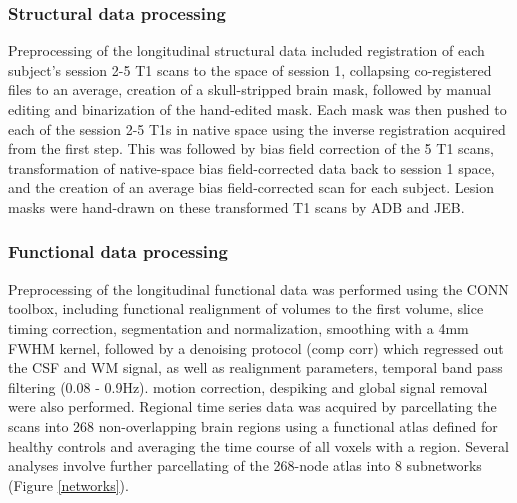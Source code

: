 \documentclass[10pt]{article}
\begin{document}
	\subsubsection*{Structural data processing}
	Preprocessing of the longitudinal structural data included registration of each subject’s session 2-5 T1 scans to the space of session 1, collapsing co-registered files to an average, creation of a skull-stripped brain mask, followed by manual editing and binarization of the hand-edited mask. Each mask was then pushed to each of the session 2-5 T1s in native space using the inverse registration acquired from the first step. This was followed by bias field correction of the 5 T1 scans, transformation of native-space bias field-corrected data back to session 1 space, and the creation of an average bias field-corrected scan for each subject. Lesion masks were hand-drawn on these transformed T1 scans by ADB and JEB.
	
	\subsubsection*{Functional data processing}
	Preprocessing of the longitudinal functional data was performed using the CONN toolbox, including functional realignment of volumes to the first volume, slice timing correction, segmentation and normalization, smoothing with a 4mm FWHM kernel, followed by a denoising protocol (comp corr) which regressed out the CSF and WM signal, as well as realignment parameters, temporal band pass filtering (0.08 - 0.9Hz). motion correction, despiking and global signal removal were also performed.  Regional time series data was acquired by parcellating the scans into 268 non-overlapping brain regions using a functional atlas defined for healthy controls \cite{Shen2013-zn} and averaging the time course of all voxels with a region.  Several analyses involve further parcellating of the 268-node atlas into 8 subnetworks \cite{Finn2015-er} (Figure \ref{networks}).
	
	
\end{document}
